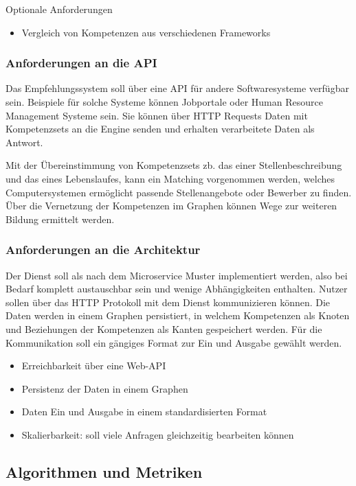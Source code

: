 Optionale Anforderungen

\begin{itemize}
	\item Vergleich von Kompetenzen aus verschiedenen Frameworks
\end{itemize}

\subsubsection{Anforderungen an die API}

Das Empfehlungssystem soll über eine API für andere Softwaresysteme verfügbar sein. Beispiele für solche Systeme können Jobportale oder Human Resource Management Systeme sein. Sie können über HTTP Requests Daten mit Kompetenzsets an die Engine senden und erhalten verarbeitete Daten als Antwort.

Mit der Übereinstimmung von Kompetenzsets zb. das einer Stellenbeschreibung und das eines Lebenslaufes, kann ein Matching vorgenommen werden, welches Computersystemen ermöglicht passende Stellenangebote oder Bewerber zu finden. Über die Vernetzung der Kompetenzen im Graphen können Wege zur weiteren Bildung ermittelt werden.


\subsubsection{Anforderungen an die Architektur}

Der Dienst soll als nach dem Microservice Muster implementiert werden, also bei Bedarf komplett austauschbar sein und wenige Abhängigkeiten enthalten. Nutzer sollen über das HTTP Protokoll mit dem Dienst kommunizieren können. Die Daten werden in einem Graphen persistiert, in welchem Kompetenzen als Knoten und Beziehungen der Kompetenzen als Kanten gespeichert werden. Für die Kommunikation soll ein gängiges Format zur Ein und Ausgabe gewählt werden.

\begin{itemize}
	\item Erreichbarkeit über eine Web-API 
	\item Persistenz der Daten in einem Graphen	
	\item Daten Ein und Ausgabe in einem standardisierten Format 
	\item Skalierbarkeit: soll viele Anfragen gleichzeitig bearbeiten können
\end{itemize}


\subsection{Algorithmen und Metriken}


